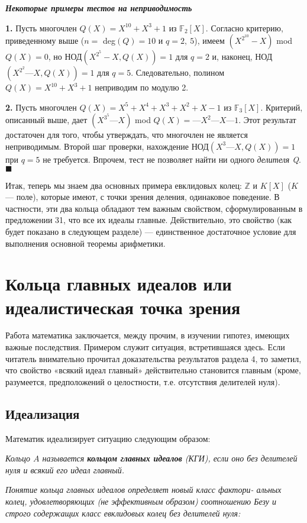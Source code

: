 \noindent\textbf{\textit{Некоторые примеры тестов на неприводимость}}

\textbf{1.} Пусть многочлен $Q(X) = X^{10} + X^3 + 1$ из $\mathbb{F}_2[X]$. Согласно  
критерию, приведенному выше ($n = $ deg$(Q) = 10$ и $q = 2,\: 5$), имеем 
$(X^{2^{10}} - X)$ mod $Q(X) = 0$, но НОД$(X^{2^5} - X,Q(X)) = 1$ для $q = 2$ и, 
наконец, НОД$(X^{2^2} — X, Q(X)) = 1$ для $q = 5$. Следовательно, полином 
$Q(X) = X^{10} + X^3 + 1$ неприводим по модулю 2.
\newpage

\textbf{2.}  Пусть многочлен $Q(X) = X^5 + X^4 + X^3 + X^2 + X - 1$ из $\mathbb{F}_3[X]$. 
Критерий, описанный выше, дает $(X^{3^5} — X)$ mod $Q(X) = —X^2 — X — 1$. 
Этот результат достаточен для того, чтобы утверждать, что  
многочлен не является неприводимым. Второй шаг проверки, нахождение 
НОД$(X^3 — X, Q(X)) = 1$ при $q = 5$ не требуется. Впрочем, тест не 
позволяет найти ни одного \textit{делителя Q}.\hspace{13.1cm}$\blacksquare$\newline


Итак, теперь мы знаем два основных примера евклидовых колец: $\mathbb{Z}$ 
и $K[X]$ ($K$ — поле), которые имеют, с точки зрения деления,  
одинаковое поведение. В частности, эти два кольца обладают тем важным 
свойством, сформулированным в предложении 31, что все их идеалы 
главные. Действительно, это свойство (как будет показано в следующем 
разделе) — единственное достаточное условие для выполнения  
основной теоремы арифметики.

\section{Кольца главных идеалов или идеалистическая точка зрения}
Работа математика заключается, между прочим, в изучении гипотез, 
имеющих важные последствия. Примером служит ситуация,  
встретившаяся здесь. Если читатель внимательно прочитал доказательства  
результатов раздела 4, то заметил, что свойство «всякий идеал главный» 
действительно становится главным (кроме, разумеется, предположений 
о целостности, т.е. отсутствия делителей нуля). 

\subsection{Идеализация}
Математик идеализирует ситуацию следующим образом:

\begin{determ}
\hspace*{15pt}\textit{Кольцо $A$ называется \textbf{кольцом главных идеалов} (КГИ), если оно 
без делителей нуля и всякий его идеал главный.}
 
\textit{Понятие кольца главных идеалов определяет новый класс фактори- 
альных колец, удовлетворяющих (не эффективным образом)  
соотношению Безу и строго содержащих класс евклидовых колец без делителей 
нуля:} 
\end{determ}

